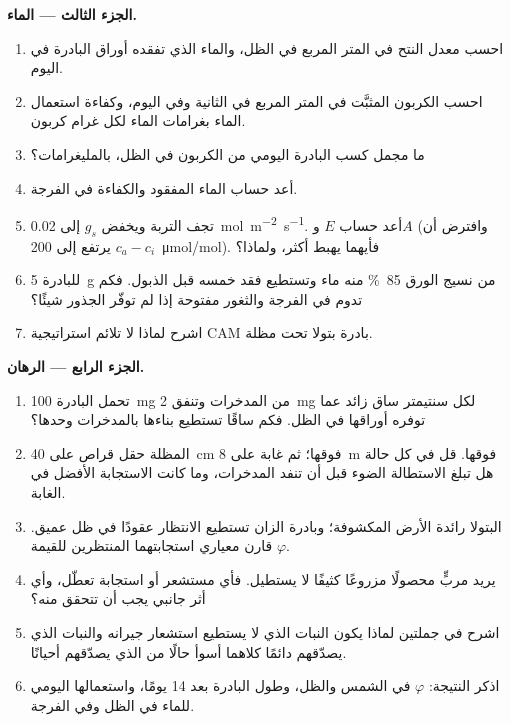 \begin{problem}
\medskip
\noindent\textbf{الجزء الثالث --- الماء.}
\begin{enumerate}[resume]
  \item احسب معدل النتح في المتر المربع في الظل،
        والماء الذي تفقده أوراق البادرة في اليوم.
  \item احسب الكربون المثبَّت في المتر المربع في الثانية وفي
        اليوم، وكفاءة استعمال الماء بغرامات الماء لكل غرام كربون.
  \item ما مجمل كسب البادرة اليومي من الكربون في الظل،
        بالمليغرامات؟
  \item أعد حساب الماء المفقود والكفاءة في الفرجة.
  \item تجف التربة ويخفض  $g_s$ إلى
        \qty{0.02}{mol.m^{-2}.s^{-1}}. أعد حساب $E$ و$A$
        (وافترض أن $c_a - c_i$ يرتفع إلى \qty{200}{\micro mol/mol}).
        فأيهما يهبط أكثر، ولماذا؟
  \item للبادرة \qty{5}{g} من نسيج الورق \qty{85}{\%} منه
        ماء وتستطيع فقد خمسه قبل الذبول. فكم تدوم
        في الفرجة والثغور مفتوحة إذا لم توفّر الجذور شيئًا؟
  \item اشرح لماذا لا تلائم استراتيجية CAM بادرة بتولا
        تحت مظلة.
\end{enumerate}

\medskip
\noindent\textbf{الجزء الرابع --- الرهان.}
\begin{enumerate}[resume]
  \item تحمل البادرة \qty{100}{mg} من المدخرات وتنفق
        \qty{2}{mg} لكل سنتيمتر ساق زائد عما توفره
        أوراقها في الظل. فكم ساقًا تستطيع بناءها بالمدخرات
        وحدها؟
  \item المظلة حقل قراص على \qty{40}{cm} فوقها؛ ثم غابة
        على \qty{8}{m} فوقها. قل في كل حالة هل تبلغ الاستطالة
        الضوء قبل أن تنفد المدخرات، وما كانت الاستجابة
        الأفضل في الغابة.
  \item البتولا رائدة الأرض المكشوفة؛ وبادرة الزان تستطيع
        الانتظار عقودًا في ظل عميق. قارن معياري استجابتهما
        المنتظرين للقيمة $\varphi$.
  \item يريد مربٍّ محصولًا مزروعًا كثيفًا لا يستطيل. فأي
        مستشعر أو استجابة تعطّل، وأي أثر جانبي يجب أن تتحقق منه؟
  \item اشرح في جملتين لماذا يكون النبات الذي لا يستطيع استشعار
        جيرانه والنبات الذي يصدّقهم دائمًا كلاهما أسوأ حالًا من
        الذي يصدّقهم أحيانًا.
  \item اذكر النتيجة: $\varphi$ في الشمس والظل، وطول
        البادرة بعد 14 يومًا، واستعمالها اليومي للماء في الظل
        وفي الفرجة.
\end{enumerate}
\end{problem}
